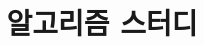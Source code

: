 \documentclass{beamer}
\title{알고리즘 스터디}
\author{}
\date{\number\year년 \number\month월 \number\day일}
\begin{document}
\frame{\titlepage}


\end{document}
